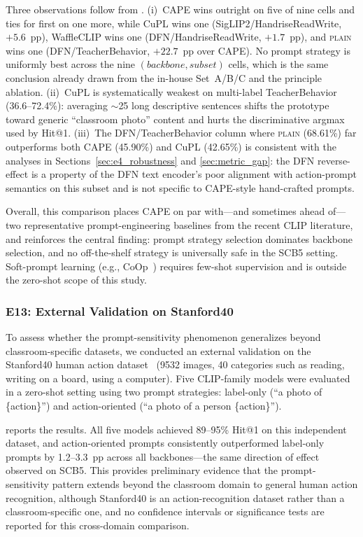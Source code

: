 \documentclass[symmetry,article,submit,pdftex,moreauthors]{Definitions/mdpi}
\begin{document}
Three observations follow from . (i)~CAPE wins outright on five of nine cells and ties for first on one more, while CuPL wins one (SigLIP2/HandriseReadWrite, $+5.6$~pp), WaffleCLIP wins one (DFN/HandriseReadWrite, $+1.7$~pp), and \textsc{plain} wins one (DFN/TeacherBehavior, $+22.7$~pp over CAPE). No prompt strategy is uniformly best across the nine $(backbone, subset)$ cells, which is the same conclusion already drawn from the in-house Set~A/B/C and the principle ablation. (ii)~CuPL is systematically weakest on multi-label TeacherBehavior (36.6--72.4\%): averaging $\sim$25 long descriptive sentences shifts the prototype toward generic ``classroom photo'' content and hurts the discriminative argmax used by Hit@1. (iii)~The DFN/TeacherBehavior column where \textsc{plain} (68.61\%) far outperforms both CAPE (45.90\%) and CuPL (42.65\%) is consistent with the analyses in Sections~\ref{sec:e4_robustness} and \ref{sec:metric_gap}: the DFN reverse-effect is a property of the DFN text encoder's poor alignment with action-prompt semantics on this subset and is not specific to CAPE-style hand-crafted prompts.

Overall, this comparison places CAPE on par with---and sometimes ahead of---two representative prompt-engineering baselines from the recent CLIP literature, and reinforces the central finding: prompt strategy selection dominates backbone selection, and no off-the-shelf strategy is universally safe in the SCB5 setting. Soft-prompt learning (e.g., CoOp~\cite{zhou2022learning}) requires few-shot supervision and is outside the zero-shot scope of this study.

\subsubsection{E13: External Validation on Stanford40}
\label{sec:e13_stanford40}

To assess whether the prompt-sensitivity phenomenon generalizes beyond classroom-specific datasets, we conducted an external validation on the Stanford40 human action dataset~\cite{yao2011stanford40} (9532 images, 40 categories such as reading, writing on a board, using a computer). Five CLIP-family models were evaluated in a zero-shot setting using two prompt strategies: label-only (``a photo of \{action\}'') and action-oriented (``a photo of a person \{action\}'').

 reports the results. All five models achieved 89--95\% Hit@1 on this independent dataset, and action-oriented prompts consistently outperformed label-only prompts by 1.2--3.3~pp across all backbones---the same direction of effect observed on SCB5. This provides preliminary evidence that the prompt-sensitivity pattern extends beyond the classroom domain to general human action recognition, although Stanford40 is an action-recognition dataset rather than a classroom-specific one, and no confidence intervals or significance tests are reported for this cross-domain comparison.
\end{document}
